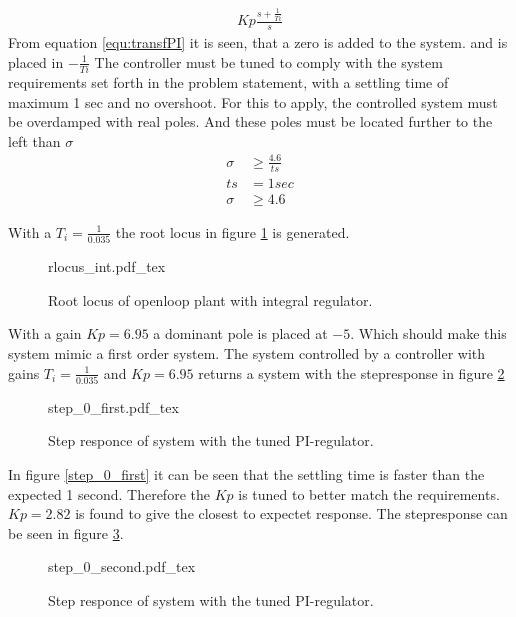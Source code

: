 \documentclass[../../../Main]{subfiles}
\begin{document}
\begin{align}
	Kp \frac{s+\frac{1}{Ti}}{s}
	\label{equ:transfPI}
\end{align}
From equation \ref{equ:transfPI} it is seen, that a zero is added to the system.
and is placed in $-\frac{1}{Ti} $
The controller must be tuned to comply with the system requirements set forth in the problem statement, with a settling time of maximum 1 sec and no overshoot. For this to apply, the controlled system must be overdamped with real poles. And these poles must be located further to the left than $\sigma$
\begin{align}
	\sigma &\ge \frac{4.6}{ts}\\
	ts &= 1 sec\\
	\sigma &\ge 4.6
\end{align}

With a $T_i = \frac{1}{0.035}$ the root locus in figure \ref{fig:rlocus_int} is generated.

\begin{figure}[H]
\centering
\def\svgwidth{\textwidth}
{rlocus_int.pdf_tex}
\caption{Root locus of openloop plant with integral regulator.}
\label{fig:rlocus_int}
\end{figure}

With a gain $Kp = 6.95$ a dominant pole is placed at $-5$. Which should make this system mimic a first order system. The system controlled by a controller with gains $T_i = \frac{1}{0.035}$ and $Kp = 6.95$ returns a system with the stepresponse in figure \ref{fig:step_0_first}

\begin{figure}[H]
\centering
\def\svgwidth{\textwidth}
{step_0_first.pdf_tex}
\caption{Step responce of system with the tuned PI-regulator.}
\label{fig:step_0_first}
\end{figure}

In figure \ref{step_0_first} it can be seen that the settling time is faster than the expected 1 second. Therefore the $Kp$ is tuned to better match the requirements. $Kp = 2.82$ is found to give the closest to expectet response. The stepresponse can be seen in figure \ref{fig:step_0_second}.

\begin{figure}[H]
\centering
\def\svgwidth{\textwidth}
{step_0_second.pdf_tex}
\caption{Step responce of system with the tuned PI-regulator.}
\label{fig:step_0_second}
\end{figure}
\end{document}
